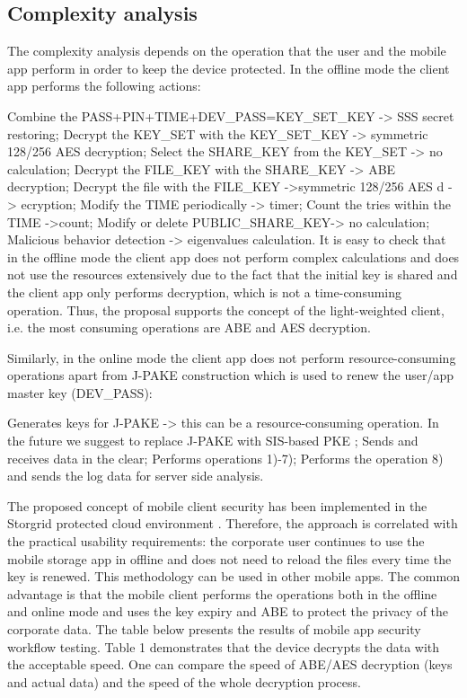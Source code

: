 \documentclass[twocolumn]{svjour3}          	%
\begin{document}
\subsection{Complexity analysis }
\label{sec_complex}

The complexity analysis depends on the operation that the user and the mobile app perform in order to keep the device protected. In the offline mode the client app performs the following actions:

Combine the PASS+PIN+TIME+DEV\_PASS=KEY\_SET\_KEY   ->  SSS secret restoring;
Decrypt the KEY\_SET with the KEY\_SET\_KEY -> symmetric 128/256 AES decryption;
Select the SHARE\_KEY from the KEY\_SET -> no calculation;
Decrypt the FILE\_KEY with the SHARE\_KEY  -> ABE decryption;
Decrypt the file with the FILE\_KEY ->symmetric 128/256 AES d -> ecryption;
Modify the TIME periodically -> timer;
Count the tries within the TIME ->count;
Modify or delete PUBLIC\_SHARE\_KEY-> no calculation;
Malicious behavior detection -> eigenvalues calculation.
It is easy to check that in the offline mode the client app does not perform complex calculations and does not use the resources extensively due to the fact that the initial key is shared and the client app only performs decryption, which is not a time-consuming operation. Thus, the proposal supports the concept of the light-weighted client, i.e. the most consuming operations are ABE and AES decryption. 

Similarly, in the online mode the client app does not perform resource-consuming operations apart from J-PAKE construction which is used to renew the user/app master key (DEV\_PASS):

Generates keys for J-PAKE -> this can be a resource-consuming operation. In the future we suggest to replace J-PAKE with SIS-based PKE \cite{bogos2013primeless,bellovin1992encrypted};
Sends and receives data in the clear;
Performs operations 1)-7);
Performs the operation 8) and sends the log data for server side analysis.

The proposed concept of mobile client security has been implemented in the Storgrid protected cloud environment \cite{storgrid2016}. Therefore, the approach is correlated with the practical usability requirements:  the corporate user continues to use the mobile storage app in offline and does not need to reload the files every time the key is renewed. This methodology can be used in other mobile apps. The common advantage is that the mobile client performs the operations both in the offline and online mode and uses the key expiry and ABE to protect the privacy of the corporate data. The table below presents the results of mobile app security workflow testing. Table 1 demonstrates that the device decrypts the data with the acceptable speed. One can compare the speed of ABE/AES decryption (keys and actual data) and the speed of the whole decryption process.
\end{document}
